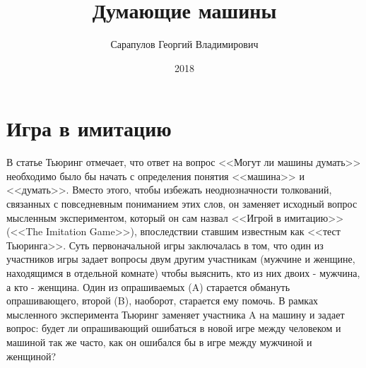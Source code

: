 \documentclass[12pt, specialist, subf, substylefile = spbu.rtx]{disser}
\begin{document}

\title{Думающие машины}


\author{Сарапулов Георгий Владимирович}


\date{2018}

\maketitle


\tableofcontents

\intro

\cite{turing1950computing}
\cite{Searle80minds}


\chapter{Игра в имитацию}
\label{sec:turing}

В статье \cite{turing1950computing} Тьюринг отмечает, что ответ на вопрос <<Могут ли машины думать>> необходимо было бы начать с определения понятия <<машина>> и <<думать>>. Вместо этого, чтобы избежать неоднозначности толкований, связанных с повседневным пониманием этих слов, он заменяет исходный вопрос мысленным экспериментом, который он сам назвал <<Игрой в имитацию>> (<<The Imitation Game>>), впоследствии ставшим известным как <<тест Тьюринга>>. Суть первоначальной игры заключалась в том, что один из участников игры задает вопросы двум другим участникам (мужчине и женщине, находящимся в отдельной комнате) чтобы выяснить, кто из них двоих - мужчина, а кто - женщина. Один из опрашиваемых (A) старается обмануть опрашивающего, второй (B), наоборот, старается ему помочь. В рамках мысленного эксперимента Тьюринг заменяет участника A на машину и задает вопрос: будет ли опрашивающий ошибаться в новой игре между человеком и машиной так же часто, как он ошибался бы в игре между мужчиной и женщиной?
\end{document}
